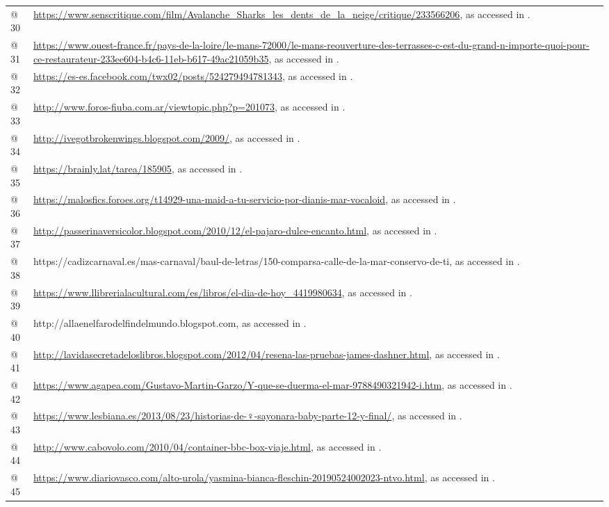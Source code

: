 \documentclass[output=paper]{langscibook}
\begin{document}
\begin{tabularx}{\textwidth}{XX}
@ 30 & \url{https://www.senscritique.com/film/Avalanche_Sharks_les_dents_de_la_neige/critique/233566206}, as accessed in \citealt{May2021}.\\
@ 31 & \url{https://www.ouest-france.fr/pays-de-la-loire/le-mans-72000/le-mans-reouverture-des-terrasses-c-est-du-grand-n-importe-quoi-pour-ce-restaurateur-233ee604-b4c6-11eb-b617-49ac21059b35}, as accessed in \citealt{May2021}.\\
@ 32 & \url{https://es-es.facebook.com/twx02/posts/524279494781343}, as accessed in \citealt{June2021}.\\
@ 33 & \url{http://www.foros-fiuba.com.ar/viewtopic.php?p=201073}{, as accessed in \citealt{May2021}.}\\
@ 34 & \url{http://ivegotbrokenwings.blogspot.com/2009/}, as accessed in \citealt{May2021}.\\
@ 35 & \url{https://brainly.lat/tarea/185905}, as accessed in \citealt{Fabruar2021}.\\
@ 36 & \url{https://malosfics.foroes.org/t14929-una-maid-a-tu-servicio-por-dianis-mar-vocaloid}, as accessed in \citealt{May2021}.\\
@ 37 & \url{http://passerinaversicolor.blogspot.com/2010/12/el-pajaro-dulce-encanto.html}, as accessed in \citealt{Februar2021}.\\
@ 38 & https://cadizcarnaval.es/mas-carnaval/baul-de-letras/150-comparsa-calle-de-la-mar-conservo-de-ti, as accessed in \citealt{Februar2021}.\\
@ 39 & \url{https://www.llibrerialacultural.com/es/libros/el-dia-de-hoy_4419980634}, as accessed in \citealt{June2021}.\\
@ 40 & http://allaenelfarodelfindelmundo.blogspot.com,  as accessed in \citealt{December2020}.\\
@ 41 & \url{http://lavidasecretadeloslibros.blogspot.com/2012/04/resena-las-pruebas-james-dashner.html}, as accessed in \citealt{December2020}.\\
@ 42 & \url{https://www.agapea.com/Gustavo-Martin-Garzo/Y-que-se-duerma-el-mar-9788490321942-i.htm}, as accessed in \citealt{December2020}.\\
@ 43 & \url{https://www.lesbiana.es/2013/08/23/historias-de-♀-sayonara-baby-parte-12-y-final/}, as accessed in \citealt{December2020}.\\
@ 44 & \url{http://www.cabovolo.com/2010/04/container-bbc-box-viaje.html}, as accessed in \citealt{Februar2021}.\\
@ 45 & \url{https://www.diariovasco.com/alto-urola/yasmina-bianca-fleschin-20190524002023-ntvo.html}, as accessed in \citealt{June2021}.\\

\end{tabularx}
\end{document}
